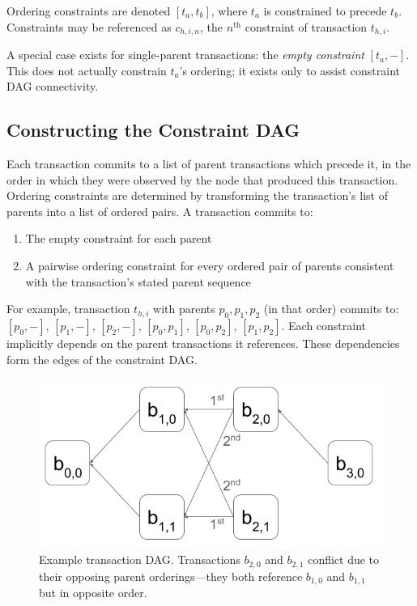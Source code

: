 \documentclass[12pt]{article}
\begin{document}
Ordering constraints are denoted $[t_a, t_b]$, where $t_a$ is constrained to
precede $t_b$. Constraints may be referenced as $c_{h,i,n}$, the $n^{\text{th}}$
constraint of transaction $t_{h,i}$.

A special case exists for single-parent transactions: the \emph{empty
constraint} $[t_a, -]$. This does not actually constrain $t_a$'s ordering; it
exists only to assist constraint DAG connectivity.

\subsection{Constructing the Constraint DAG}
Each transaction commits to a list of parent transactions which precede it, in
the order in which they were observed by the node that produced this
transaction. Ordering constraints are determined by transforming the
transaction's list of parents into a list of ordered pairs. A transaction
commits to:
\begin{enumerate}
\item The empty constraint for each parent
\item A pairwise ordering constraint for every ordered pair of parents consistent with the transaction's stated parent sequence
\end{enumerate}

For example, transaction $t_{h,i}$ with parents $p_0, p_1, p_2$ (in that order)
commits to: $[p_0, -]$, $[p_1, -]$, $[p_2, -]$, $[p_0, p_1]$, $[p_0, p_2]$,
$[p_1, p_2]$. Each constraint implicitly depends on the parent transactions it
references. These dependencies form the edges of the constraint DAG.

\begin{figure}
  \centering
  \includegraphics[width=\columnwidth]{images/block_dag.png}
  \caption{Example transaction DAG. Transactions $b_{2,0}$ and $b_{2,1}$ conflict due to their opposing parent orderings—they both reference $b_{1,0}$ and $b_{1,1}$ but in opposite order.}\label{fig:transaction_dag}
\end{figure}
\end{document}
